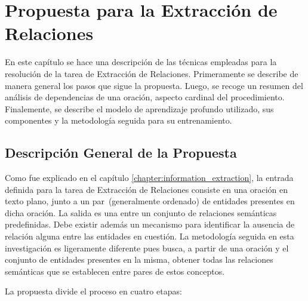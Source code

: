 \chapter{Propuesta para la Extracción de Relaciones}\label{chapter:relations}

En este capítulo se hace una descripción de las técnicas empleadas para la resolución de la tarea de Extracción de Relaciones.
Primeramente se describe de manera general los pasos que sigue la propuesta.
Luego, se recoge un resumen del análisis de dependencias de una oración, aspecto cardinal del procedimiento.
Finalemente, se describe el modelo de aprendizaje profundo utilizado, sus componentes y la metodología seguida para su entrenamiento.

\section{Descripción General de la Propuesta}

Como fue explicado en el capítulo \ref{chapter:information_extraction}, la entrada definida para la tarea de Extracción de Relaciones consiste en una oración en texto plano, junto a un par~(generalmente ordenado) de entidades presentes en dicha oración.
La salida es una entre un conjunto de relaciones semánticas predefinidas.
Debe existir además un mecanismo para identificar la ausencia de relación alguna entre las entidades en cuestión.
La metodología seguida en esta investigación es ligeramente diferente pues busca, a partir de una oración y el conjunto de entidades presentes en la misma, obtener todas las relaciones semánticas que se establecen entre pares de estos conceptos.

La propuesta divide el proceso en cuatro etapas:

